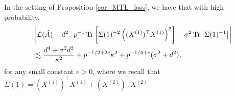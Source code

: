 \begin{claim}
In the setting of Proposition \ref{cor_MTL_loss}, we have that with high probability,
\begin{align}
&\left|\mathcal L(\hat A)- d^2\cdot {p}^{-1}\operatorname{Tr}\left[\Sigma(1)^{-2} \left((X^{(1)})^\top X^{(1)} \right)^2\right] -\sigma^2  \operatorname{Tr}\left[\Sigma(1)^{-1}  \right]\right| \nonumber\\
&\lesssim  \frac{d^4 + \sigma^2 d^2}{\kappa^2}+p^{-1/2+2e}\kappa^2 +  p^{-1/4+e} (\sigma^2 +d^2) , \label{simple1}
\end{align}
for any small constant $e>0$, where we recall that $\Sigma(1)= (X^{(1)})^\top X^{(1)}  + (X^{(2)})^\top X^{(2)}$.
\end{claim}
